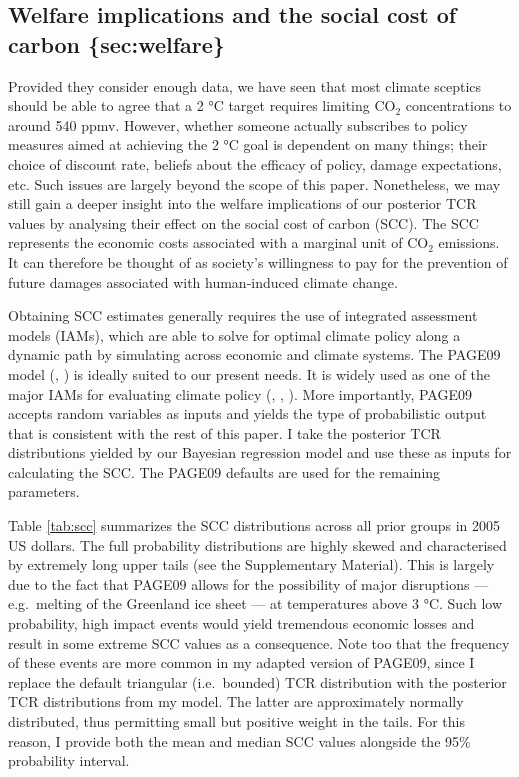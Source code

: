 \documentclass[smallextended]{svjour3}       %
\begin{document}
\hypertarget{welfare-implications-and-the-social-cost-of-carbon-secwelfare}{%
\subsection{Welfare implications and the social cost of carbon
\{sec:welfare\}}\label{welfare-implications-and-the-social-cost-of-carbon-secwelfare}}

Provided they consider enough data, we have seen that most climate
sceptics should be able to agree that a 2 °C target requires limiting
CO\(_2\) concentrations to around 540 ppmv. However, whether someone
actually subscribes to policy measures aimed at achieving the 2 °C goal
is dependent on many things; their choice of discount rate, beliefs
about the efficacy of policy, damage expectations, etc. Such issues are
largely beyond the scope of this paper. Nonetheless, we may still gain a
deeper insight into the welfare implications of our posterior TCR values
by analysing their effect on the social cost of carbon (SCC). The SCC
represents the economic costs associated with a marginal unit of
CO\(_2\) emissions. It can therefore be thought of as society's
willingness to pay for the prevention of future damages associated with
human-induced climate change.

Obtaining SCC estimates generally requires the use of integrated
assessment models (IAMs), which are able to solve for optimal climate
policy along a dynamic path by simulating across economic and climate
systems. The PAGE09 model (\cite{hope2011page09},
\cite{hope2011page09scc}) is ideally suited to our present needs. It is
widely used as one of the major IAMs for evaluating climate policy
(\cite{iwg2010scc}, \cite{iwg2013scc}, \cite{nordhaus2014scc}). More
importantly, PAGE09 accepts random variables as inputs and yields the
type of probabilistic output that is consistent with the rest of this
paper. I take the posterior TCR distributions yielded by our Bayesian
regression model and use these as inputs for calculating the SCC. The
PAGE09 defaults are used for the remaining parameters.

Table \ref{tab:scc} summarizes the SCC distributions across all prior
groups in 2005 US dollars. The full probability distributions are highly
skewed and characterised by extremely long upper tails (see the
Supplementary Material). This is largely due to the fact that PAGE09
allows for the possibility of major disruptions --- e.g.~melting of the
Greenland ice sheet --- at temperatures above 3 °C. Such low
probability, high impact events would yield tremendous economic losses
and result in some extreme SCC values as a consequence. Note too that
the frequency of these events are more common in my adapted version of
PAGE09, since I replace the default triangular (i.e.~bounded) TCR
distribution with the posterior TCR distributions from my model. The
latter are approximately normally distributed, thus permitting small but
positive weight in the tails. For this reason, I provide both the mean
and median SCC values alongside the 95\% probability interval.
\end{document}
